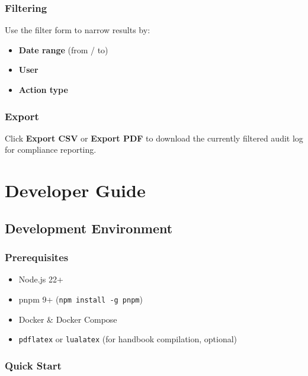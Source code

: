 \documentclass[12pt,a4paper,twoside]{report}
\newcommand{\code}[1]{\texttt{#1}}
\begin{document}
\section{Filtering}

Use the filter form to narrow results by:
\begin{itemize}
  \item \textbf{Date range} (from / to)
  \item \textbf{User}
  \item \textbf{Action type}
\end{itemize}

\section{Export}

Click \textbf{Export CSV} or \textbf{Export PDF} to download the
currently filtered audit log for compliance reporting.

\part{Developer Guide}
\label{part:dev}

\chapter{Development Environment}
\label{ch:devenv}

\section{Prerequisites}

\begin{itemize}
  \item Node.js 22+
  \item pnpm 9+ (\code{npm install -g pnpm})
  \item Docker \& Docker Compose
  \item \code{pdflatex} or \code{lualatex} (for handbook compilation, optional)
\end{itemize}

\section{Quick Start}
\end{document}
